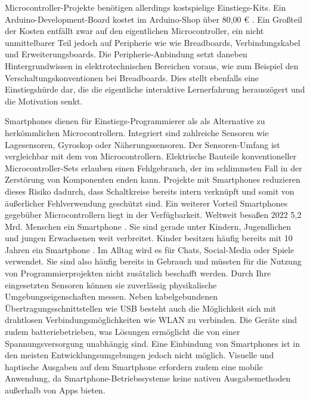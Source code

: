 \documentclass[11pt,a4paper]{report}
\begin{document}
Microcontroller-Projekte benötigen allerdings kostspielige Einstiegs-Kits.
Ein Arduino-Development-Board kostet im Arduino-Shop über 80,00 € \cite{arduino_kit}.
Ein Großteil der Kosten entfällt zwar auf den eigentlichen Microcontroller, ein nicht unmittelbarer Teil jedoch auf Peripherie wie wie Breadboards, Verbindungskabel und Erweiterungsboards.
Die Peripherie-Anbindung setzt daneben Hintergrundwissen in elektrotechnischen Bereichen voraus, wie zum Beispiel den Verschaltungskonventionen bei Breadboards.
Dies stellt ebenfalls eine Einstiegshürde dar, die die eigentliche interaktive Lernerfahrung herauszögert und die Motivation senkt.

Smartphones dienen für Einstiegs-Programmierer als als Alternative zu herkömmlichen Microcontrollern.
Integriert sind zahlreiche Sensoren wie Lagesensoren, Gyroskop oder Näherungssensoren.
Der Sensoren-Umfang ist vergleichbar mit dem von Microcontrollern.
Elektrische Bauteile konventioneller Microcontroller-Sets erlauben einen Fehlgebrauch, der im schlimmsten Fall in der Zerstörung von Komponenten enden kann.
Projekte mit Smartphones reduzieren dieses Risiko dadurch, dass Schaltkreise bereits intern verknüpft und somit von äußerlicher Fehlverwendung geschützt sind.
Ein weiterer Vorteil Smartphones gegebüber Microcontrollern liegt in der Verfügbarkeit.
Weltweit besaßen 2022 5,2 Mrd. Menschen ein Smartphone \cite{smartphone_users}.
Sie sind gerade unter Kindern, Jugendlichen und jungen Erwachsenen weit verbreitet.
Kinder besitzen häufig bereits mit 10 Jahren ein Smartphone \cite{bitkom_smartphones}.
Im Alltag wird es für Chats, Social-Media oder Spiele verwendet.
Sie sind also häufig bereits in Gebrauch und müssten für die Nutzung von Programmierprojekten nicht zusätzlich beschafft werden.
Durch Ihre eingesetzten Sensoren können sie zuverlässig physikalische Umgebungseigenschaften messen.
Neben kabelgebundenen Übertragungsschnittstellen wie USB besteht auch die Möglichkeit sich mit drahtlosen Verbindungsmöglichkeiten wie WLAN zu verbinden.
Die Geräte sind zudem batteriebetrieben, was Lösungen ermöglicht die von einer Spannungsversorgung unabhängig sind.
Eine Einbindung von Smartphones ist in den meisten Entwicklungsumgebungen jedoch nicht möglich.
Visuelle und haptische Ausgaben auf dem Smartphone erfordern zudem eine mobile Anwendung, da Smartphone-Betriebssysteme keine nativen Ausgabemethoden außerhalb von Apps bieten.
\end{document}
